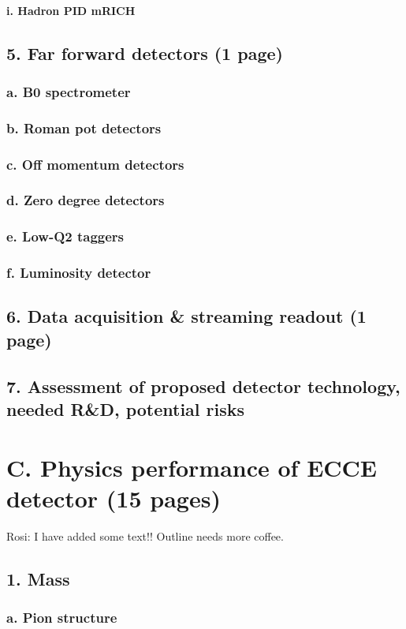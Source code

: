 \documentclass{report}
\begin{document}
\paragraph{i. Hadron PID mRICH}
\newpage
\subsection{5. Far forward detectors (1 page)}
\subsubsection{a. B0 spectrometer}
\subsubsection{b. Roman pot detectors}
\subsubsection{c. Off momentum detectors}
\subsubsection{d. Zero degree detectors}
\subsubsection{e. Low-Q2 taggers}
\subsubsection{f. Luminosity detector}
\subsection{6. Data acquisition \& streaming readout (1 page)}
\subsection{7. Assessment of proposed detector technology, needed R\&D, potential risks}
%
\section{C. Physics performance of ECCE detector (15 pages)}
Rosi: I have added some text!!  Outline needs more coffee.
\subsection{1. Mass}
\subsubsection{a. Pion structure}
\end{document}
